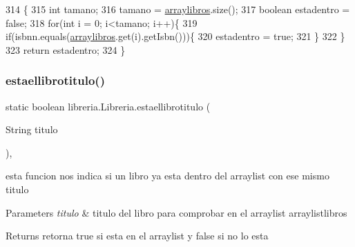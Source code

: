 \begin{DoxyCode}
314                                                     \{
315          \textcolor{keywordtype}{int} tamano;
316          tamano = \mbox{\hyperlink{classlibreria_1_1_libreria_aa55c2bad2db92eb94ea1ba9c6997f47d}{arraylibros}}.size();
317          \textcolor{keywordtype}{boolean} estadentro = \textcolor{keyword}{false};
318          \textcolor{keywordflow}{for}(\textcolor{keywordtype}{int} i = 0; i<tamano; i++)\{
319              \textcolor{keywordflow}{if}(isbnn.equals(\mbox{\hyperlink{classlibreria_1_1_libreria_aa55c2bad2db92eb94ea1ba9c6997f47d}{arraylibros}}.get(i).getIsbn()))\{
320                  estadentro = \textcolor{keyword}{true};
321              \}
322          \}
323          \textcolor{keywordflow}{return} estadentro;
324      \}
\end{DoxyCode}
\mbox{\label{classlibreria_1_1_libreria_aec6380fd1bcff89fb0f2d6d4b4584598}} 
\subsubsection{\texorpdfstring{estaellibrotitulo()}{estaellibrotitulo()}}
{\footnotesize\ttfamily static boolean libreria.\+Libreria.\+estaellibrotitulo (\begin{DoxyParamCaption}\item[{String}]{titulo }\end{DoxyParamCaption})\hspace{0.3cm}{\ttfamily [inline]}, {\ttfamily [static]}}

esta funcion nos indica si un libro ya esta dentro del arraylist con ese mismo titulo 
\begin{DoxyParams}{Parameters}
{\em titulo} & titulo del libro para comprobar en el arraylist arraylistlibros \\
\hline
\end{DoxyParams}
\begin{DoxyReturn}{Returns}
retorna true si esta en el arraylist y false si no lo esta 
\end{DoxyReturn}

